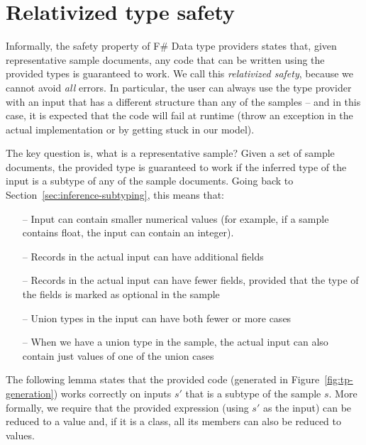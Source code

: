\documentclass[10pt,preprint,clearpagebib]{sigplanconf}
\begin{document}
%
%

\section{Relativized type safety}
\label{sec:safety}

Informally, the safety property of F\# Data type providers states that, given representative sample
documents, any code that can be written using the provided types is guaranteed to work. We call this 
\emph{relativized safety}, because we cannot avoid \emph{all} errors. In particular, the user can 
always use the type provider with an input that has a different structure than any of the samples -- and in 
this case, it is expected that the code will fail at runtime (throw an exception in the actual 
implementation or by getting stuck in our model).

The key question is, what is a representative sample? Given a set of sample documents, 
the provided type is guaranteed to work if the inferred type of the input is a subtype of any of the
sample documents. Going back to Section~\ref{sec:inference-subtyping}, this means that:
%
\begin{itemize}[noitemsep]
\item[--] Input can contain smaller numerical values (for example, if a sample contains float, the input can contain an integer).
\item[--] Records in the actual input can have additional fields
\item[--] Records in the actual input can have fewer fields, provided that the type of the fields is marked as optional in the sample
\item[--] Union types in the input can have both fewer or more cases
\item[--] When we have a union type in the sample, the actual input can also contain just values of one of the union cases
\end{itemize}
%
The following lemma states that the provided code (generated in Figure~\ref{fig:tp-generation})
works correctly on inputs $s'$ that is a subtype of the sample $s$. More formally, we require that the 
provided expression (using $s'$ as the input) can be reduced to a value and, if it is a class,
all its members can also be reduced to values.
\end{document}
